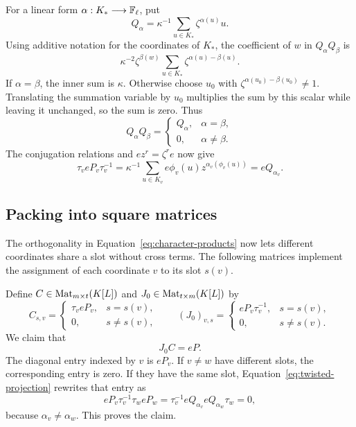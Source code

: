For a linear form $\alpha:K_*\longrightarrow\mathbb F_\ell$, put
\begin{equation}
\label{eq:local-character-idempotent}
Q_\alpha=\kappa^{-1}\sum_{u\in K_*}\zeta^{\alpha(u)}u.
\end{equation}
Using additive notation for the coordinates of $K_*$, the coefficient
of $w$ in $Q_\alpha Q_\beta$ is
\[
\kappa^{-2}\zeta^{\beta(w)}
\sum_{u\in K_*}\zeta^{\alpha(u)-\beta(u)}.
\]
If $\alpha=\beta$, the inner sum is $\kappa$. Otherwise choose $u_0$
with $\zeta^{\alpha(u_0)-\beta(u_0)}\ne1$. Translating the summation
variable by $u_0$ multiplies the sum by this scalar while leaving it
unchanged, so the sum is zero. Thus
\begin{equation}
\label{eq:character-products}
Q_\alpha Q_\beta=
\begin{cases}
Q_\alpha,&\alpha=\beta,\\
0,&\alpha\ne\beta.
\end{cases}
\end{equation}
The conjugation relations and $ez^r=\zeta^re$ now give
\begin{equation}
\label{eq:twisted-projection}
\tau_v eP_v\tau_v^{-1}
=\kappa^{-1}\sum_{u\in K_v}
 e\phi_v(u)z^{\alpha_v(\phi_v(u))}
=eQ_{\alpha_v}.
\end{equation}

\subsection{Packing into square matrices}

The orthogonality in Equation~\eqref{eq:character-products} now lets
different coordinates share a slot without cross terms. The following
matrices implement the assignment of each coordinate $v$ to its slot
$s(v)$.

Define $C\in\operatorname{Mat}_{m\times t}(K[L])$ and
$J_0\in\operatorname{Mat}_{t\times m}(K[L])$ by
\begin{equation}
\label{eq:packing-matrices}
C_{s,v}=
\begin{cases}
\tau_veP_v,&s=s(v),\\
0,&s\ne s(v),
\end{cases}
\qquad
(J_0)_{v,s}=
\begin{cases}
eP_v\tau_v^{-1},&s=s(v),\\
0,&s\ne s(v).
\end{cases}
\end{equation}
We claim that
\begin{equation}
\label{eq:packing-identity}
J_0C=eP.
\end{equation}
The diagonal entry indexed by $v$ is $eP_v$. If $v\ne w$ have different
slots, the corresponding entry is zero. If they have the same slot,
Equation~\eqref{eq:twisted-projection} rewrites that entry as
\[
eP_v\tau_v^{-1}\tau_weP_w
=\tau_v^{-1}eQ_{\alpha_v}eQ_{\alpha_w}\tau_w=0,
\]
because $\alpha_v\ne\alpha_w$. This proves the claim.

